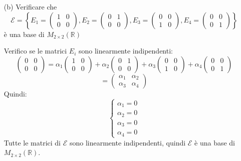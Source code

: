 \documentclass[a4paper]{article}
\theoremstyle{break}
\theoremstyle{break}
\theoremstyle{break}
\theoremstyle{break}
\begin{document}
\begin{enumerate}
	\item[(b)] Verificare che
	      \[
		      \mathcal{E} = \left\{
		      E_1 = \begin{pmatrix}
			      1 & 0 \\
			      0 & 0
		      \end{pmatrix} ,
		      E_2 = \begin{pmatrix}
			      0 & 1 \\
			      0 & 0
		      \end{pmatrix} ,
		      E_3 = \begin{pmatrix}
			      0 & 0 \\
			      1 & 0
		      \end{pmatrix} ,
		      E_4 = \begin{pmatrix}
			      0 & 0 \\
			      0 & 1
		      \end{pmatrix}
		      \right\}
	      \]
	      è una base di \( M_{2 \times 2}(\mathbb{R}) \)

        \vspace{1em}
        \noindent Verifico se le matrici \( E_i \) sono linearmente indipendenti:
        \[
        \begin{pmatrix} 
          0 & 0\\
          0 & 0
        \end{pmatrix}
        =
        \alpha_1 \begin{pmatrix} 
          1 & 0\\
          0 & 0
        \end{pmatrix}
        +
        \alpha_2 \begin{pmatrix} 
          0 & 1\\
          0 & 0
        \end{pmatrix}
        +
        \alpha_3 \begin{pmatrix} 
          0 & 0\\
          1 & 0
        \end{pmatrix}
        +
        \alpha_4 \begin{pmatrix} 
          0 & 0\\
          0 & 1
        \end{pmatrix}
        \]
        \[
        = \begin{pmatrix} 
          \alpha_1 & \alpha_2\\
          \alpha_3 & \alpha_4
        \end{pmatrix}
        \]
        Quindi:
        \[
        \begin{cases}
          \alpha_1 = 0\\
          \alpha_2 = 0\\
          \alpha_3 = 0\\
          \alpha_4 = 0
        \end{cases}
        \]
        Tutte le matrici di \( \mathcal{E} \) sono linearmente indipendenti, quindi
        \( \mathcal{E} \) è una base di \( M_{2 \times 2}(\mathbb{R}) \).


\end{enumerate}
\end{document}

